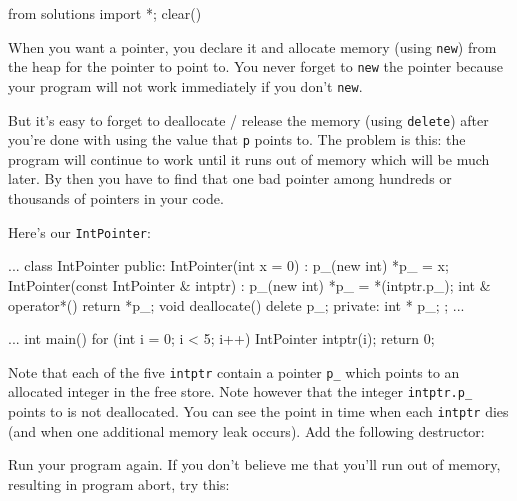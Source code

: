 \begin{python0}
from solutions import *; clear()
\end{python0}

When you want a pointer, you declare it and allocate memory (using
\texttt{new}) from the heap for the pointer to point to. You never forget
to \texttt{new} the pointer because your program will not work immediately
if you don't \texttt{new}.

But it's easy to forget to deallocate / release the
memory (using \texttt{delete}) after you're done with
using the value that \texttt{p} points to. The problem is this: the
program will continue to work until it runs out of memory which will be
much later. By then you have to find that one bad pointer among hundreds
or thousands of pointers in your code.

Here's our \texttt{IntPointer}:

\begin{consolethree}[escapeinside=||]
...
class IntPointer
{
public:
    IntPointer(int x = 0)
        : p_(new int)
    {
        *p_ = x;
    }
    IntPointer(const IntPointer & intptr)
        : p_(new int)
    {
        *p_ = *(intptr.p_);
    }
    int & operator*()
    {
        return *p_;
    }
    void deallocate()
    {
        delete p_;
    }
private:
    int * p_;
};
...
\end{consolethree}

\begin{consolethree}[escapeinside=||]
...
int main()
{
    for (int i = 0; i < 5; i++)
    {
        IntPointer intptr(i);
    }
    return 0;
}
\end{consolethree}

Note that each of the five \texttt{intptr} contain a pointer \texttt{p\_}
which points to an allocated integer in the free store. Note however
that the integer \texttt{intptr.p\_} points to is not deallocated. You can
see the point in time when each \texttt{intptr} dies (and when one
additional memory leak occurs). Add the following destructor:

\begin{consolethree}[escapeinside=||]
...
class IntPointer
{
public:
    ...
    ~IntPointer()
    {
        std::cout << "memory leak ... :(\n";
    }
    ...
\end{consolethree}

Run your program again. If you don't believe me that
you'll run out of memory, resulting in program abort,
try this:

